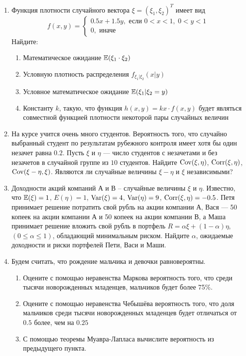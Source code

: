 \begin{enumerate}
\item Функция плотности случайного вектора $\xi=(\xi_1, \xi_2)^T$ имеет вид
\[
f(x,y)=\begin{cases}
0.5x + 1.5y, \text{ если } 0<x<1, \; 0<y<1 \\
0, \text{ иначе }
\end{cases}
\]
Найдите:
\begin{enumerate}
\item Математическое ожидание $\operatorname{\mathbb{E}}(\xi_1 \cdot \xi_2)$
\item Условную плотность распределения $f_{\xi_1|\xi_2} (x|y)$
\item Условное математическое ожидание $\operatorname{\mathbb{E}}(\xi_1| \xi_2=y)$
\item Константу $k$, такую, что функция $h(x,y)=kx\cdot f(x,y)$ будет являться
совместной функцией плотности некоторой пары случайных величин
\end{enumerate}

\item На курсе учится очень много студентов. Вероятность того, что случайно
выбранный студент по результатам рубежного контроля имеет хотя бы один незачет
равна $0.2$. Пусть $\xi$ и $\eta$ — число студентов с незачетами и без незачетов
в случайной группе из $10$ студентов. Найдите $\operatorname{Cov}(\xi,\eta)$, $\operatorname{Corr}(\xi,\eta)$,
$\operatorname{Cov}(\xi-\eta,\xi)$. Являются ли случайные величины $\xi-\eta$ и $\xi$ независимыми?

\item Доходности акций компаний А и В – случайные величины $\xi$ и $\eta$. Известно,
что $\operatorname{\mathbb{E}}(\xi)=1$, $E(\eta)=1$, $\operatorname{Var}(\xi)=4$, $\operatorname{Var}(\eta)=9$, $\operatorname{Corr}(\xi,\eta)=-0.5$.
Петя принимает решение потратить свой рубль на акции компании А, Вася — 50 копеек
на акции компании А и 50 копеек на акции компании В, а Маша  принимает решение
вложить свой рубль в портфель $R=\alpha\xi+(1-\alpha)\eta$, $(0 \leq \alpha \leq 1)$,
обладающий минимальным риском. Найдите $\alpha$, ожидаемые доходности и риски портфелей
Пети, Васи и Маши.

\item Будем считать, что рождение мальчика и девочки равновероятны.
\begin{enumerate}
\item Оцените с помощью неравенства Маркова вероятность того, что среди тысячи
новорожденных младенцев, мальчиков будет более 75\%.
\item Оцените с помощью неравенства Чебышёва вероятность того, что доля мальчиков
среди тысячи новорожденных младенцев будет отличаться от $0.5$ более, чем на $0.25$
\item С помощью теоремы Муавра-Лапласа вычислите вероятность из предыдущего пункта.
\end{enumerate}


\end{enumerate}
